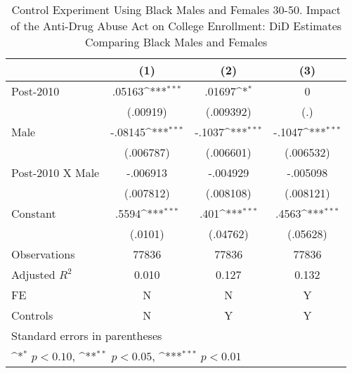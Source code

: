 \begin{table}[htbp]\centering
\def\sym#1{\ifmmode^{#1}\else\(^{#1}\)\fi}
\caption{Control Experiment Using Black Males and Females 30-50. Impact of the Anti-Drug Abuse Act on College Enrollment: DiD Estimates Comparing Black Males and Females}
\begin{tabular}{l*{3}{c}}
\hline\hline
                    &\multicolumn{1}{c}{(1)}         &\multicolumn{1}{c}{(2)}         &\multicolumn{1}{c}{(3)}         \\
\hline
Post-2010           &      .05163\sym{***}&      .01697\sym{*}  &           0         \\
                    &    (.00919)         &   (.009392)         &         (.)         \\
[1em]
Male                &     -.08145\sym{***}&      -.1037\sym{***}&      -.1047\sym{***}\\
                    &   (.006787)         &   (.006601)         &   (.006532)         \\
[1em]
Post-2010 X Male    &    -.006913         &    -.004929         &    -.005098         \\
                    &   (.007812)         &   (.008108)         &   (.008121)         \\
[1em]
Constant            &       .5594\sym{***}&        .401\sym{***}&       .4563\sym{***}\\
                    &     (.0101)         &    (.04762)         &    (.05628)         \\
\hline
Observations        &       77836         &       77836         &       77836         \\
Adjusted \(R^{2}\)  &       0.010         &       0.127         &       0.132         \\
FE                  &           N         &           N         &           Y         \\
Controls            &           N         &           Y         &           Y         \\
\hline\hline
\multicolumn{4}{l}{\footnotesize Standard errors in parentheses}\\
\multicolumn{4}{l}{\footnotesize \sym{*} \(p<0.10\), \sym{**} \(p<0.05\), \sym{***} \(p<0.01\)}\\
\end{tabular}
\end{table}
